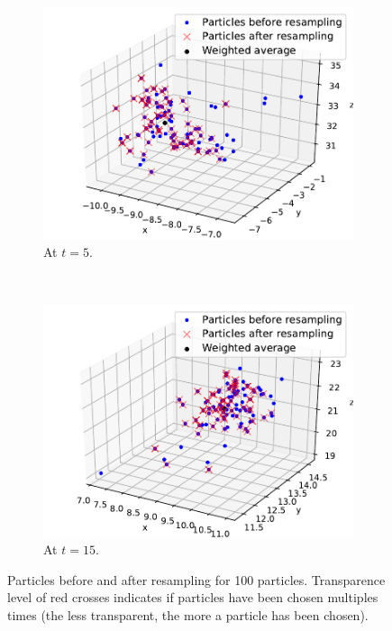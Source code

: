 \documentclass[english, DIV=13]{scrartcl}
\begin{document}
\begin{figure}
    \centering
    \begin{subfigure}{0.49\textwidth}
        \includegraphics[width=\textwidth]{figures/particles-5-100}
        \caption{At $t=5$.}
        \label{fig:particle-5-100}
    \end{subfigure}%
    ~
    \begin{subfigure}{0.49\textwidth}
        \includegraphics[width=\textwidth]{figures/particles-15-100}
        \caption{At $t=15$.}
        \label{fig:particle-15-100}
    \end{subfigure}
    \caption{Particles before and after resampling for 100 particles.
    Transparence level of red crosses indicates if particles have been chosen
    multiples times (the less transparent, the more a particle has been chosen).}
\end{figure}
\end{document}
